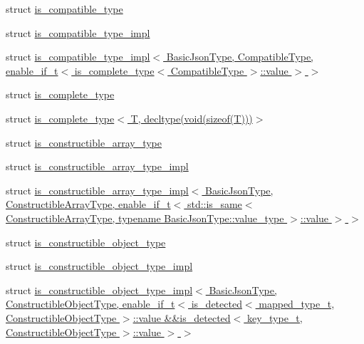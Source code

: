\begin{DoxyCompactItemize}
struct \hyperlink{structnlohmann_1_1detail_1_1is__compatible__type}{is\+\_\+compatible\+\_\+type}
\item 
struct \hyperlink{structnlohmann_1_1detail_1_1is__compatible__type__impl}{is\+\_\+compatible\+\_\+type\+\_\+impl}
\item 
struct \hyperlink{structnlohmann_1_1detail_1_1is__compatible__type__impl_3_01BasicJsonType_00_01CompatibleType_00_fa54cb60e66f5c6ba93b1dd3f418b703}{is\+\_\+compatible\+\_\+type\+\_\+impl$<$ Basic\+Json\+Type, Compatible\+Type, enable\+\_\+if\+\_\+t$<$ is\+\_\+complete\+\_\+type$<$ Compatible\+Type $>$\+::value $>$ $>$}
\item 
struct \hyperlink{structnlohmann_1_1detail_1_1is__complete__type}{is\+\_\+complete\+\_\+type}
\item 
struct \hyperlink{structnlohmann_1_1detail_1_1is__complete__type_3_01T_00_01decltype_07void_07sizeof_07T_08_08_08_4}{is\+\_\+complete\+\_\+type$<$ T, decltype(void(sizeof(\+T)))$>$}
\item 
struct \hyperlink{structnlohmann_1_1detail_1_1is__constructible__array__type}{is\+\_\+constructible\+\_\+array\+\_\+type}
\item 
struct \hyperlink{structnlohmann_1_1detail_1_1is__constructible__array__type__impl}{is\+\_\+constructible\+\_\+array\+\_\+type\+\_\+impl}
\item 
struct \hyperlink{structnlohmann_1_1detail_1_1is__constructible__array__type__impl_3_01BasicJsonType_00_01Construce6fa33688da703b95649da4749cdeb98}{is\+\_\+constructible\+\_\+array\+\_\+type\+\_\+impl$<$ Basic\+Json\+Type, Constructible\+Array\+Type, enable\+\_\+if\+\_\+t$<$ std\+::is\+\_\+same$<$ Constructible\+Array\+Type, typename Basic\+Json\+Type\+::value\+\_\+type $>$\+::value $>$ $>$}
\item 
struct \hyperlink{structnlohmann_1_1detail_1_1is__constructible__object__type}{is\+\_\+constructible\+\_\+object\+\_\+type}
\item 
struct \hyperlink{structnlohmann_1_1detail_1_1is__constructible__object__type__impl}{is\+\_\+constructible\+\_\+object\+\_\+type\+\_\+impl}
\item 
struct \hyperlink{structnlohmann_1_1detail_1_1is__constructible__object__type__impl_3_01BasicJsonType_00_01Construa4d1e16800f2c4963485512ecf18377c}{is\+\_\+constructible\+\_\+object\+\_\+type\+\_\+impl$<$ Basic\+Json\+Type, Constructible\+Object\+Type, enable\+\_\+if\+\_\+t$<$ is\+\_\+detected$<$ mapped\+\_\+type\+\_\+t, Constructible\+Object\+Type $>$\+::value \&\&is\+\_\+detected$<$ key\+\_\+type\+\_\+t, Constructible\+Object\+Type $>$\+::value $>$ $>$}

\end{DoxyCompactItemize}
